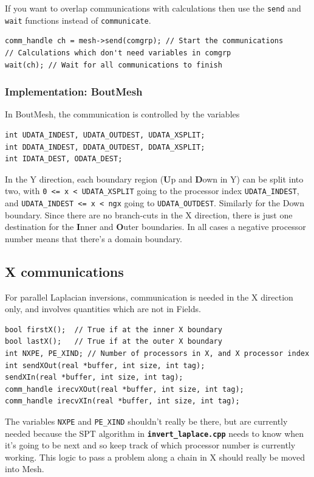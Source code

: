 \documentclass[12pt]{article}
\newcommand{\code}[1]{\texttt{#1}}
\newcommand{\file}[1]{\texttt{\bf #1}}
\begin{document}
If you want to overlap communications with calculations then
use the \code{send} and \code{wait} functions instead of \code{communicate}.
\begin{lstlisting}
comm_handle ch = mesh->send(comgrp); // Start the communications
// Calculations which don't need variables in comgrp
wait(ch); // Wait for all communications to finish
\end{lstlisting}

\subsubsection{Implementation: BoutMesh}

In BoutMesh, the communication is controlled by the variables
\begin{lstlisting}
int UDATA_INDEST, UDATA_OUTDEST, UDATA_XSPLIT;
int DDATA_INDEST, DDATA_OUTDEST, DDATA_XSPLIT;
int IDATA_DEST, ODATA_DEST;
\end{lstlisting}
In the Y direction, each boundary region ({\bf U}p and {\bf D}own in Y) 
can be split into two, with \code{0 <= x < UDATA\_XSPLIT} going to
the processor index \code{UDATA\_INDEST}, and \code{UDATA\_INDEST <= x < ngx}
going to \code{UDATA\_OUTDEST}. Similarly for the Down boundary.
Since there are no branch-cuts in the X direction, there is just one
destination for the {\bf I}nner and {\bf O}uter boundaries.
In all cases a negative processor number means that there's a domain boundary.

\subsection{X communications}

For parallel Laplacian inversions, communication is needed in the X
direction only, and involves quantities which are not in Fields.

\begin{lstlisting}
bool firstX();  // True if at the inner X boundary
bool lastX();   // True if at the outer X boundary
int NXPE, PE_XIND; // Number of processors in X, and X processor index
int sendXOut(real *buffer, int size, int tag);
sendXIn(real *buffer, int size, int tag);
comm_handle irecvXOut(real *buffer, int size, int tag);
comm_handle irecvXIn(real *buffer, int size, int tag);
\end{lstlisting}

The variables \code{NXPE} and \code{PE\_XIND} shouldn't really be there,
but are currently needed because the SPT algorithm in \file{invert\_laplace.cpp}
needs to know when it's going to be next and so keep track of which processor
number is currently working. This logic to pass a problem along a chain in
X should really be moved into Mesh.
\end{document}
